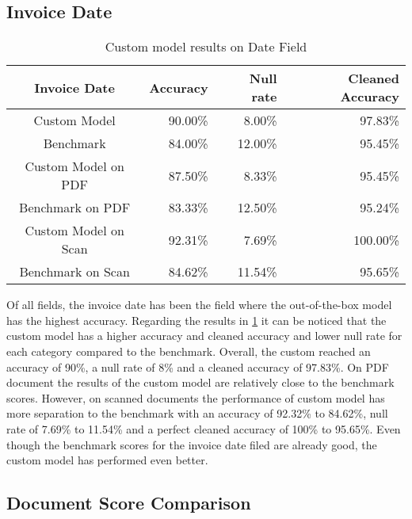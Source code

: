 \subsection*{Invoice Date}
\begin{table}[ht]   %
    \centering
    \footnotesize
    \begin{tabular}{c|rrr} %
        \toprule    %
        Invoice Date  & Accuracy  & Null rate & Cleaned Accuracy \\
        \midrule    %
        Custom Model               & 90.00\%   & 8.00\%   & 97.83\% \\
        Benchmark           & 84.00\%   & 12.00\%  & 95.45\%\\
        \midrule    %
        Custom Model on PDF        & 87.50\%   & 8.33\%  & 95.45\% \\
        Benchmark on PDF    & 83.33\%   & 12.50\%  & 95.24\% \\
        \midrule    %
        Custom Model on Scan       & 92.31\%  & 7.69\%   & 100.00\% \\
        Benchmark on Scan   & 84.62\%  & 11.54\%  & 95.65\% \\

        \bottomrule %
    \end{tabular}
    \caption{Custom model results on Date Field}
    \label{table:Model_Bench_Date}
\end{table}

Of all fields, the invoice date has been the field where the out-of-the-box model has the highest accuracy.
Regarding the results in \cref{table:Model_Bench_Date} it can be noticed that the custom model has a higher accuracy and cleaned accuracy and lower null rate for each category compared to the benchmark.
Overall, the custom reached an accuracy of 90\%, a null rate of 8\% and a cleaned accuracy of 97.83\%. 
On PDF document the results of the custom model are relatively close to the benchmark scores.
However, on scanned documents the performance of custom model has more separation to the benchmark with an accuracy of 92.32\% to 84.62\%, null rate of 7.69\% to 11.54\% and a perfect cleaned accuracy of 100\% to 95.65\%.
Even though the benchmark scores for the invoice date filed are already good, the custom model has performed even better.

\subsection*{Document Score Comparison}

